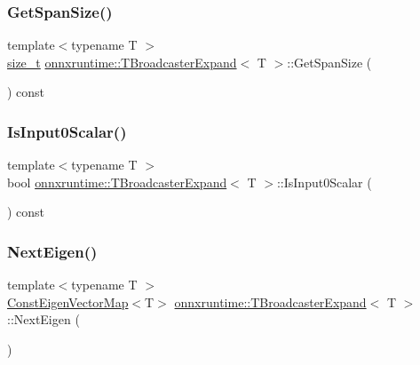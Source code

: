 \subsubsection{\texorpdfstring{Get\+Span\+Size()}{GetSpanSize()}}
{\footnotesize\ttfamily template$<$typename T $>$ \\
\mbox{\hyperlink{mlasi_8h_a503efbc1c6e50825320ad909366b78ab}{size\+\_\+t}} \mbox{\hyperlink{structonnxruntime_1_1TBroadcasterExpand}{onnxruntime\+::\+T\+Broadcaster\+Expand}}$<$ T $>$\+::Get\+Span\+Size (\begin{DoxyParamCaption}{ }\end{DoxyParamCaption}) const\hspace{0.3cm}{\ttfamily [inline]}}

\mbox{\label{structonnxruntime_1_1TBroadcasterExpand_ae8492f89a6100cd05dd890f74a9596d5}} 
\subsubsection{\texorpdfstring{Is\+Input0\+Scalar()}{IsInput0Scalar()}}
{\footnotesize\ttfamily template$<$typename T $>$ \\
bool \mbox{\hyperlink{structonnxruntime_1_1TBroadcasterExpand}{onnxruntime\+::\+T\+Broadcaster\+Expand}}$<$ T $>$\+::Is\+Input0\+Scalar (\begin{DoxyParamCaption}{ }\end{DoxyParamCaption}) const\hspace{0.3cm}{\ttfamily [inline]}}

\mbox{\label{structonnxruntime_1_1TBroadcasterExpand_a6e8353c3f6e4d485bf4d74f5cedeeba3}} 
\subsubsection{\texorpdfstring{Next\+Eigen()}{NextEigen()}}
{\footnotesize\ttfamily template$<$typename T $>$ \\
\mbox{\hyperlink{namespaceonnxruntime_a16eca66228ee3a40fe3ae89db53e08ee}{Const\+Eigen\+Vector\+Map}}$<$T$>$ \mbox{\hyperlink{structonnxruntime_1_1TBroadcasterExpand}{onnxruntime\+::\+T\+Broadcaster\+Expand}}$<$ T $>$\+::Next\+Eigen (\begin{DoxyParamCaption}{ }\end{DoxyParamCaption})\hspace{0.3cm}{\ttfamily [inline]}}

